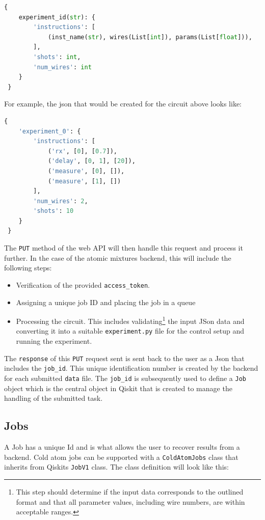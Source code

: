 \documentclass[a4paper, 10pt]{article}
\newcommand{\co}[1]{\texttt{#1}}
\begin{document}
\begin{lstlisting}[language=Python, caption = Incoming circuit data received by the backend as a Json dictionary., label = {lst:circuit_json}]
{
    experiment_id(str): {
        'instructions': [
            (inst_name(str), wires(List[int]), params(List[float])),
        ], 
        'shots': int, 
        'num_wires': int
    }
 }
\end{lstlisting}
For example, the json that would be created for the circuit above looks like:
\begin{lstlisting}[language=Python, caption = Example of incoming circuit data received by the NaLi device backend as a Json file. The instructions in data show that this circuit is to be run with one trapping site. An \co{rx} rotation with angle 0.7 radians is applied to the Na atoms followed by a 20 ms delay. Finally the Na atom is measured., label = {lst:circuit_json_example}]
{
    'experiment_0': {
        'instructions': [
            ('rx', [0], [0.7]), 
            ('delay', [0, 1], [20]), 
            ('measure', [0], []),
            ('measure', [1], [])
        ], 
        'num_wires': 2,
        'shots': 10
    }
 }
\end{lstlisting}
The \co{PUT} method of the web API will then handle this request and process it further.  In the case of the atomic mixtures backend, this will include the following steps:
\begin{itemize}
    \item Verification of the provided \co{access\_token}.
    \item Assigning a unique job ID and placing the job in a queue
    \item Processing the circuit. This includes validating\footnote{This step should determine if the input data corresponds to the outlined format and that all parameter values, including wire numbers, are within acceptable ranges.} the input JSon data and converting it into a suitable \co{experiment.py} file for the control setup and running the experiment. 
\end{itemize}
The \co{response} of this \co{PUT} request sent is sent back to the user as a Json that includes the \co{job\_id}.
This unique identification number is created by the backend for each submitted \co{data} file.
The \co{job\_id} is subsequently used to define a \co{Job} object which is the central object in Qiskit that is created to manage the handling of the submitted task. 

\subsection{Jobs}
A Job has a unique Id and is what allows the user to recover results from a backend.
Cold atom jobs can be supported with a \co{ColdAtomJobs} class  that inherits from Qiskits \co{JobV1} class. The class definition will look like this: 
\end{document}
